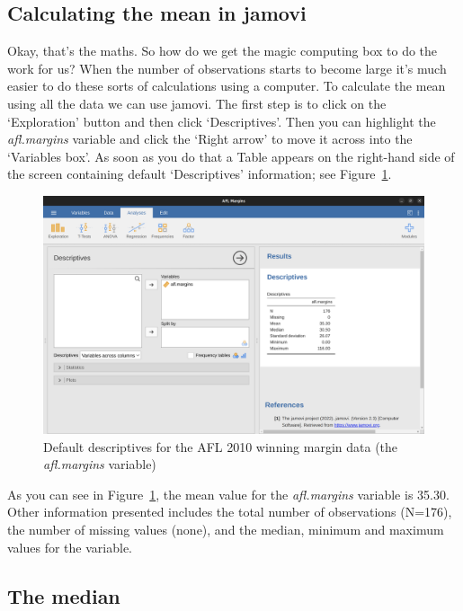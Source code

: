 \documentclass[
  a4paper,
]{book}
\begin{document}
\hypertarget{calculating-the-mean-in-jamovi}{%
\subsection{Calculating the mean in
jamovi}\label{calculating-the-mean-in-jamovi}}

Okay, that's the maths. So how do we get the magic computing box to do
the work for us? When the number of observations starts to become large
it's much easier to do these sorts of calculations using a computer. To
calculate the mean using all the data we can use jamovi. The first step
is to click on the `Exploration' button and then click `Descriptives'.
Then you can highlight the \emph{afl.margins} variable and click the
`Right arrow' to move it across into the `Variables box'. As soon as you
do that a Table appears on the right-hand side of the screen containing
default `Descriptives' information; see Figure~\ref{fig-fig4-3}.

\begin{figure}

\includegraphics[width=1\textwidth,height=\textheight]{images/fig4-3.png} \hfill{}

\caption{\label{fig-fig4-3}Default descriptives for the AFL 2010 winning
margin data (the \emph{afl.margins} variable)}

\end{figure}

As you can see in Figure~\ref{fig-fig4-3}, the mean value for the
\emph{afl.margins} variable is 35.30. Other information presented
includes the total number of observations (N=176), the number of missing
values (none), and the median, minimum and maximum values for the
variable.

\hypertarget{the-median}{%
\subsection{The median}\label{the-median}}
\end{document}
